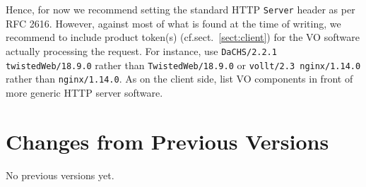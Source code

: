 \documentclass[11pt,a4paper]{ivoa}
\newcommand{\headername}[1]{{\tt #1}}
\begin{document}
Hence, for now we recommend setting the standard HTTP
\headername{Server} header as
per RFC 2616.  However, against most of what is found at the time of
writing, we recommend to include product token(s)
(cf.sect.~\ref{sect:client}) for the VO software actually processing the
request.  For instance, use \verb|DaCHS/2.2.1 twistedWeb/18.9.0| rather than
\verb|TwistedWeb/18.9.0| or \verb|vollt/2.3 nginx/1.14.0| rather than
\verb|nginx/1.14.0|.  As on the client side, list VO components in front
of more generic HTTP server software.

\appendix
\section{Changes from Previous Versions}

No previous versions yet.  



\end{document}
